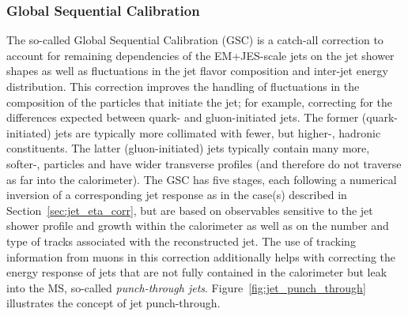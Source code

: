 \subsubsection{Global Sequential Calibration}
\label{sec:jet_gsc}

The so-called Global Sequential Calibration (GSC) is a catch-all correction to account for remaining dependencies
of the EM+JES-scale jets on the jet shower shapes as well as fluctuations in the jet flavor composition and inter-jet energy distribution.
This correction improves the handling of fluctuations in the composition of the particles that initiate the jet; for example, correcting for the differences expected between quark- and gluon-initiated jets.
The former (quark-initiated) jets are typically more collimated with fewer, but higher-\pT, hadronic constituents.
The latter (gluon-initiated) jets typically contain many more, softer-\pT, particles and have wider transverse profiles
(and therefore do not traverse as far into the calorimeter).
The GSC has five stages, each following a numerical inversion of a corresponding jet response as in the case(s)
described in Section~\ref{sec:jet_eta_corr}, but are based on observables sensitive to the jet shower profile and growth
within the calorimeter as well as on the number and type of tracks associated with the reconstructed jet.
The use of tracking information from muons in this correction additionally helps with correcting the energy response of jets that
are not fully contained in the calorimeter but leak into the MS, so-called \textit{punch-through jets}.
Figure~\ref{fig:jet_punch_through} illustrates the concept of jet punch-through.

